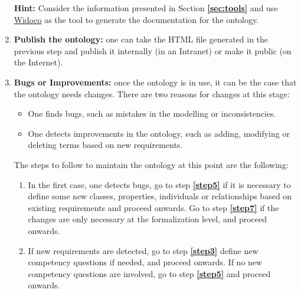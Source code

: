 \documentclass{guideline/sty/rapport}
\begin{document}
\begin{enumerate}
\begin{mdframed}[backgroundcolor=officegreen!8, linecolor=officegreen]
    \begin{minipage}[t]{1\linewidth}
    \textbf{Hint:}
      Consider the information presented in Section \textbf{\ref{sec:tools}} and use \href{https://github.com/dgarijo/WIDOCO/releases/tag/v1.4.17}{Widoco} as the tool to generate the documentation for the ontology.
    \end{minipage}
\end{mdframed}

\item \textcolor{sapphire}{\textbf{Publish the ontology:}} one can take the HTML file generated in the previous step and publish it internally (in an Intranet) or make it public (on the Internet). \label{step10}

\item \textcolor{sapphire}{\textbf{Bugs or Improvements:}} once the ontology is in use, it can be the case that the ontology needs changes. There are two reasons for changes at this stage: \label{step11}

\begin{itemize}
    \item One finds bugs, such as mistakes in the modelling or inconsistencies.
    \item One detects improvements in the ontology, such as adding, modifying or deleting terms based on new requirements.
\end{itemize}

The steps to follow to maintain the ontology at this point are the following:
\begin{enumerate}
    \item In the first case, one detects bugs, go to step \textbf{\ref{step5}} if it is necessary to define some new classes, properties, individuals or relationships based on existing requirements and proceed onwards. Go to step \textbf{\ref{step7}} if the changes are only necessary at the formalization level, and proceed onwards.
    \item If new requirements are detected, go to step \textbf{\ref{step3}} define new competency questions if needed, and proceed onwards. If no new competency questions are involved, go to step \textbf{\ref{step5}} and proceed onwards.
\end{enumerate}

\end{enumerate}

\singlespacing
\end{document}
